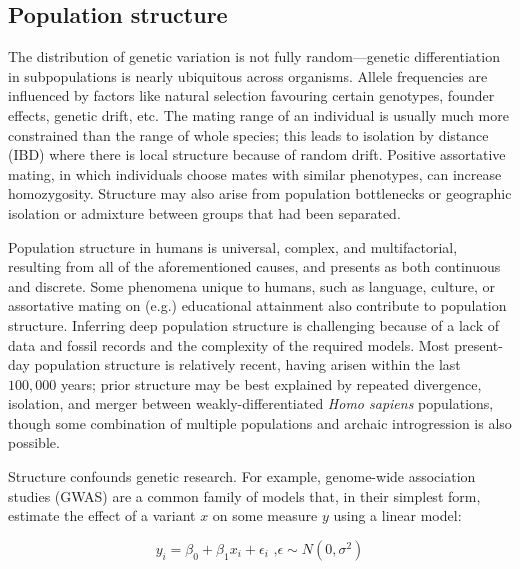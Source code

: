 \subsection{Population structure}

The distribution of genetic variation is not fully random---genetic differentiation in subpopulations is nearly ubiquitous across organisms. Allele frequencies are influenced by factors like natural selection favouring certain genotypes, founder effects, genetic drift, etc\citep{hartl2007principles_6}. The mating range of an individual is usually much more constrained than the range of whole species; this leads to isolation by distance (IBD) where there is local structure because of random drift\citep{wright_isolation_1943}. Positive assortative mating, in which individuals choose mates with similar phenotypes, can increase homozygosity\citep{hartl2007principles_6}. Structure may also arise from population bottlenecks or geographic isolation\citep{crow_kimura_1970_3} or admixture between groups that had been separated\citep{crow_kimura_1970_9}. 

Population structure in humans is universal, complex, and multifactorial, resulting from all of the aforementioned causes, and presents as both continuous and discrete\citep{peter_geometric_2022}. Some phenomena unique to humans, such as language\citep{barbujani_zones_1990}, culture\citep{campbell_evolution_2010}, or assortative mating on (e.g.) educational attainment\citep{robinson_genetic_2017} also contribute to population structure. Inferring deep population structure is challenging because of a lack of data and fossil records and the complexity of the required models. Most present-day population structure is relatively recent, having arisen within the last $100,000$ years; prior structure may be best explained by repeated divergence, isolation, and merger between weakly-differentiated \textit{Homo sapiens} populations, though some combination of multiple populations and archaic introgression is also possible\citep{ragsdale_weakly_2023}.

Structure confounds genetic research. For example, genome-wide association studies (GWAS) are a common family of models that, in their simplest form, estimate the effect of a variant $x$ on some measure $y$ using a linear model:

$$ y_{i} = \beta_0 + \beta_{1}x_{i} + \epsilon_{i} \text{ ,} \epsilon \sim N(0,\sigma^{2})$$

